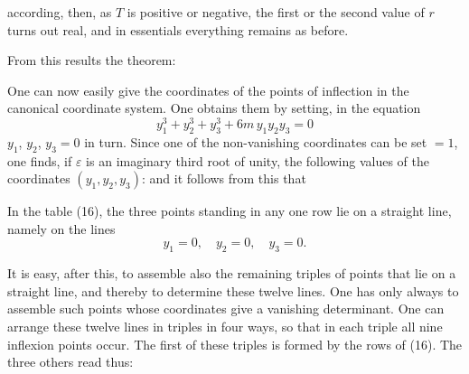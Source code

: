 according, then, as $T$ is positive or negative, the first or the
second value of $r$ turns out real, and in essentials everything
remains as before.

From this results the theorem:


One can now easily give the coordinates of the points of inflection
in the canonical coordinate system. One obtains them
by setting, in the equation
\[
y_1^3+y_2^3+y_3^3+6m\,y_1y_2y_3=0
\]
$y_1$, $y_2$, $y_3=0$ in turn. Since one of the non-vanishing
coordinates can be set $=1$, one finds, if $\varepsilon$
is an imaginary third root of unity, the following values
of the coordinates $(y_1, y_2, y_3)$:
and it follows from this that 

In the table (16), the three points standing in any one row
lie on a straight line, namely on the lines
\[
y_1=0, \quad y_2=0, \quad y_3=0.
\]

It is easy, after this, to assemble also the remaining triples of points
that lie on a straight line, and thereby
to determine these twelve lines. One has only always to
assemble such points whose coordinates give a vanishing
determinant. One can arrange these twelve lines
in triples in four ways, so that in each triple all
nine inflexion points occur. The first of these triples is
formed by the rows of (16). The three others read thus:
